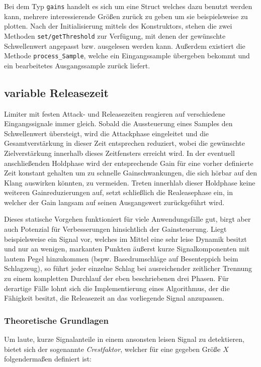 \documentclass[paper=a4, fontsize=12pt]{scrartcl}
\numberwithin{equation}{section}		%
\numberwithin{figure}{section}			%
\numberwithin{table}{section}				%
\begin{document}
Bei dem Typ \texttt{gains} handelt es sich um eine Struct welches dazu benutzt werden kann, mehrere interessierende Größen zurück zu geben um sie beispielsweise zu plotten. Nach der Initialisierung mittels des Konstruktors, stehen die zwei Methoden \texttt{set/getThreshold} zur Verfügung, mit denen der gewünschte Schwellenwert angepasst bzw. ausgelesen werden kann. Außerdem existiert die Methode \texttt{process\_Sample}, welche ein Eingangssample übergeben bekommt und ein bearbeitetes Ausgangssample zurück liefert.

\subsection{variable Releasezeit}
Limiter mit festen Attack- und Releasezeiten reagieren auf verschiedene Eingangssignale immer gleich. Sobald die Aussteuerung eines Samples den Schwellenwert übersteigt, wird die Attackphase eingeleitet und die Gesamtverstärkung in dieser Zeit entsprechen reduziert, wobei die gewünschte Zielverstärkung innerhalb dieses Zeitfensters erreicht wird. In der eventuell anschließenden Holdphase wird der entsprechende Gain für eine vorher definierte Zeit konstant gehalten um zu schnelle Gainschwankungen, die sich hörbar auf den Klang auswirken könnten, zu vermeiden. Treten innerhlab dieser Holdphase keine weiteren Gainreduzierungen auf, setzt schließlich die Realeasephase ein, in welcher der Gain langsam auf seinen Ausgangswert zurückgeführt wird.

Dieses statische Vorgehen funktioniert für viele Anwendungsfälle gut, birgt aber auch Potenzial für Verbesserungen hinsichtlich der Gainsteuerung. Liegt beispielsweise ein Signal vor, welches im Mittel eine sehr leise Dynamik besitzt und nur an wenigen, markanten Punkten äußerst kurze Signalkomponenten mit lautem Pegel hinzukommen (bspw. Basedrumschläge auf Besenteppich beim Schlagzeug), so führt jeder einzelne Schlag bei ausreichender zeitlicher Trennung zu einem kompletten Durchlauf der eben beschriebenen drei Phasen. Für derartige Fälle lohnt sich die Implementierung eines Algorithmus, der die Fähigkeit besitzt, die Releasezeit an das vorliegende Signal anzupassen.


\subsubsection{Theoretische Grundlagen}
Um laute, kurze Signalanteile in einem ansonsten leisen Signal zu detektieren, bietet sich der sogenannte \textit{Crestfaktor}, welcher für eine gegeben Größe $X$ folgendermaßen definiert ist:
\end{document}
